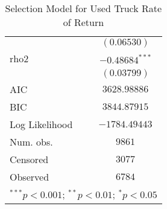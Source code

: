 \begin{table}
\begin{center}
\begin{tiny}
\begin{tabular}{l c}
                          & $(0.06530)$      \\
rho2                      & $-0.48684^{***}$ \\
                          & $(0.03799)$      \\
\hline
AIC                       & $3628.98886$     \\
BIC                       & $3844.87915$     \\
Log Likelihood            & $-1784.49443$    \\
Num. obs.                 & $9861$           \\
Censored                  & $3077$           \\
Observed                  & $6784$           \\
\hline
\multicolumn{2}{l}{\tiny{$^{***}p<0.001$; $^{**}p<0.01$; $^{*}p<0.05$}}
\end{tabular}
\end{tiny}
\caption{Selection Model for Used Truck Rate of Return}
\label{tab:tobit_5_sel}
\end{center}
\end{table}

